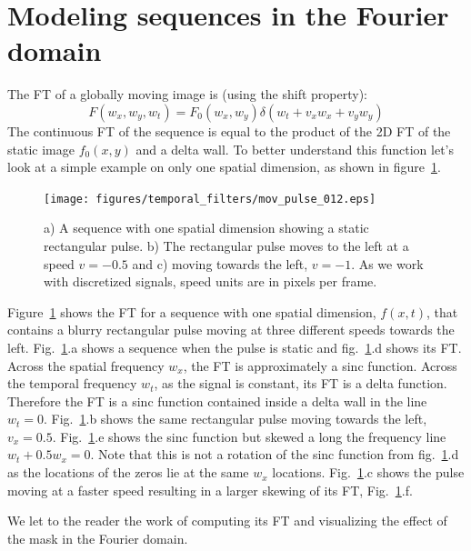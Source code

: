 \section{Modeling sequences in the Fourier domain}

The FT of a globally moving image is (using the shift property):
\begin{equation}
F (w_x,w_y,w_t) = F_0 (w_x, w_y) \delta (w_t + v_x w_x + v_y w_y)
\end{equation}
The continuous FT of the sequence is equal to the product of the 2D FT of the static image $f_0(x,y)$ and a delta wall. To better understand this function let's look at a simple example on only one spatial dimension, as shown in figure~\ref{fig:mov_pulse_012}. 

\begin{figure}
\texttt{[image: figures/temporal\_filters/mov\_pulse\_012.eps]}
\caption{a) A sequence with one spatial dimension showing a static rectangular pulse. b) The rectangular pulse moves to the left at a speed $v=-0.5$ and c) moving towards the left, $v=-1$. As we work with discretized signals, speed units are in pixels per frame.} 
\label{fig:mov_pulse_012}
\end{figure}

Figure~\ref{fig:mov_pulse_012} shows the FT for a sequence with one spatial dimension, $f(x,t)$, that contains a blurry rectangular pulse moving at three different speeds towards the left. Fig.~\ref{fig:mov_pulse_012}.a shows a sequence when the pulse is static and fig.~\ref{fig:mov_pulse_012}.d shows its FT.  Across the spatial frequency $w_x$, the FT is approximately a sinc function. Across the temporal frequency $w_t$, as the signal is constant, its FT is a delta function.  Therefore the FT is a sinc function contained inside a delta wall in the line $w_t=0$. Fig.~\ref{fig:mov_pulse_012}.b shows the same rectangular pulse moving towards the left, $v_x=0.5$. Fig.~\ref{fig:mov_pulse_012}.e shows the sinc function but skewed a long the frequency line $w_t+0.5w_x=0$. Note that this is not a rotation of the sinc function from fig.~\ref{fig:mov_pulse_012}.d as the locations of the zeros lie at the same $w_x$ locations. Fig.~\ref{fig:mov_pulse_012}.c shows the pulse moving at a faster speed resulting in a larger skewing of its FT, Fig.~\ref{fig:mov_pulse_012}.f.


We let to the reader the work of computing its FT and visualizing the effect of the mask in the Fourier domain.



